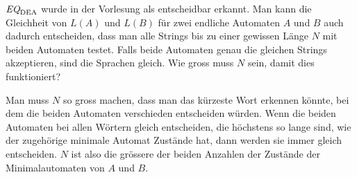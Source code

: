 $\text{\it EQ}_{\text{DEA}}$ wurde in der Vorlesung als entscheidbar
erkannt. Man kann die Gleichheit von $L(A)$ und $L(B)$ für
zwei endliche Automaten $A$ und $B$ auch dadurch entscheiden,
dass man alle Strings bis zu einer gewissen Länge $N$ mit
beiden Automaten testet. Falls beide Automaten genau die
gleichen Strings akzeptieren, sind die Sprachen gleich.
Wie gross muss $N$ sein, damit dies funktioniert?

\begin{loesung}
Man muss $N$ so gross machen, dass man das kürzeste Wort erkennen
könnte, bei dem die beiden Automaten verschieden entscheiden
würden. Wenn die beiden Automaten bei allen Wörtern gleich entscheiden,
die höchstens so lange sind, wie der zugehörige minimale Automat Zustände
hat, dann werden sie immer gleich entscheiden. $N$ ist also die grössere
der beiden Anzahlen der Zustände der Minimalautomaten von $A$ und $B$.
\end{loesung}
